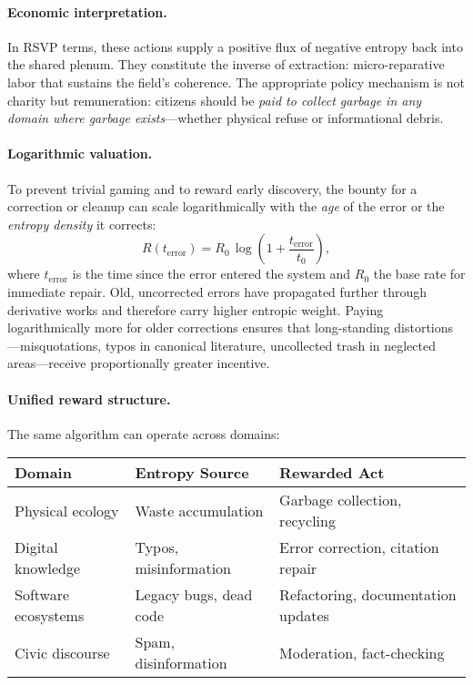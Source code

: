 \documentclass[12pt]{article}
\begin{document}
\paragraph{Economic interpretation.}
In RSVP terms, these actions supply a positive flux of negative entropy back into the shared plenum. They constitute the inverse of extraction: micro-reparative labor that sustains the field’s coherence. The appropriate policy mechanism is not charity but remuneration: citizens should be \emph{paid to collect garbage in any domain where garbage exists}—whether physical refuse or informational debris.

\paragraph{Logarithmic valuation.}
To prevent trivial gaming and to reward early discovery, the bounty for a correction or cleanup can scale logarithmically with the \emph{age} of the error or the \emph{entropy density} it corrects:
\[
R(t_{\mathrm{error}}) = R_0 \, \log\!\left(1 + \frac{t_{\mathrm{error}}}{t_0}\right),
\]
where $t_{\mathrm{error}}$ is the time since the error entered the system and $R_0$ the base rate for immediate repair. Old, uncorrected errors have propagated further through derivative works and therefore carry higher entropic weight. Paying logarithmically more for older corrections ensures that long-standing distortions—misquotations, typos in canonical literature, uncollected trash in neglected areas—receive proportionally greater incentive.

\paragraph{Unified reward structure.}
The same algorithm can operate across domains:
\begin{center}
\begin{tabular}{@{}lll@{}}
\toprule
\textbf{Domain} & \textbf{Entropy Source} & \textbf{Rewarded Act}\\
\midrule
Physical ecology & Waste accumulation & Garbage collection, recycling \\
Digital knowledge & Typos, misinformation & Error correction, citation repair \\
Software ecosystems & Legacy bugs, dead code & Refactoring, documentation updates \\
Civic discourse & Spam, disinformation & Moderation, fact-checking \\
\bottomrule
\end{tabular}
\end{center}
\end{document}
